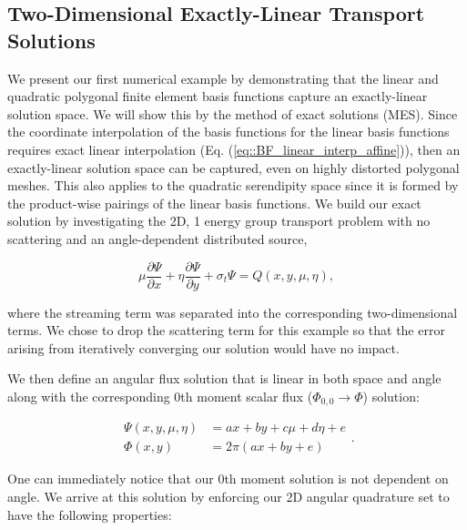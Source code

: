 \subsection{Two-Dimensional Exactly-Linear Transport Solutions}
\label{sec::BF_Results_Linear}

We present our first numerical example by demonstrating that the linear and quadratic polygonal finite element basis functions capture an exactly-linear solution space. We will show this by the method of exact solutions (MES). Since the coordinate interpolation of the basis functions for the linear basis functions requires exact linear interpolation (Eq. (\ref{eq::BF_linear_interp_affine})), then an exactly-linear solution space can be captured, even on highly distorted polygonal meshes. This also applies to the quadratic serendipity space since it is formed by the product-wise pairings of the linear basis functions. We build our exact solution by investigating the 2D, 1 energy group transport problem with no scattering and an angle-dependent distributed source,

\begin{equation}
\label{eq::BF_Results_Linear_angflux}
\mu \frac{\partial \Psi}{\partial x} + \eta \frac{\partial \Psi}{\partial y} + \sigma_t \Psi = Q(x,y, \mu, \eta), 
\end{equation}

\noindent where the streaming term was separated into the corresponding two-dimensional terms. We chose to drop the scattering term for this example so that the error arising from iteratively converging our solution would have no impact.

We then define an angular flux solution that is linear in both space and angle along with the corresponding 0th moment scalar flux ($\Phi_{0,0} \rightarrow \Phi$) solution:

\begin{equation}
\label{eq::BF_Results_Linear_fluxsols}
\begin{aligned}
\Psi (x,y,\mu,\eta) &= ax + by + c \mu + d\eta + e\\
\Phi (x,y) &= 2 \pi \left( ax + by  + e \right)
\end{aligned} .
\end{equation}

\noindent One can immediately notice that our 0th moment solution is not dependent on angle. We arrive at this solution by enforcing our 2D angular quadrature set to have the following properties:

